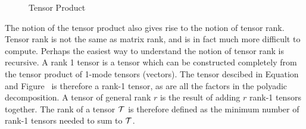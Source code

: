 \documentclass[../ut-dissertation.tex]{subfiles}
\begin{document}
\begin{figure}%
  \centering
  \qquad
  \qquad
  \caption{Tensor Product} \label{fig:tensor_product}
\end{figure}

The notion of the tensor product also gives rise to the notion of
tensor rank.  Tensor rank is not the same as matrix rank, and is in
fact much more difficult to compute.  Perhaps the easiest way to
understand the notion of tensor rank is recursive.  A rank 1 tensor is
a tensor which can be constructed completely from the tensor product
of 1-mode tensors (vectors).  The tensor descibed in
Equation~\label{eq:tensor_product} and
Figure~\label{fig:tensor_product} is therefore a rank-1 tensor, as are
all the factors in the polyadic decomposition.  A tensor of general
rank $r$ is the result of adding $r$ rank-1 tensors together. The rank
of a tensor $\mathcal{T}$ is therefore defined as the minimum number of
rank-1 tensors needed to sum to $\mathcal{T}$.
\end{document}
